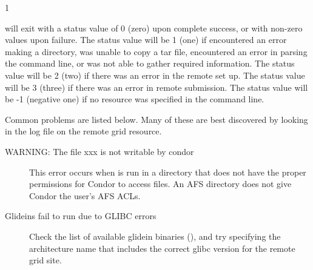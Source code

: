 \begin{ManPage}{\label{man-condor-glidein}}{1}
\begin{Options}
\end{Options}

\ExitStatus

 will exit with a status value of 0 (zero) upon 
complete success,
or with non-zero values upon failure.
The status value will be 1 (one) if 
 encountered an error making a directory,
was unable to copy a tar file,
encountered an error in parsing the command line,
or was not able to gather required information.
The status value will be 2 (two) if 
there was an error in the remote set up.
The status value will be 3 (three) if 
there was an error in remote submission.
The status value will be -1 (negative one) if 
no resource was specified in the command line.

Common problems are listed below.  Many of these are best discovered by
looking in the  log file on the remote grid resource.

\begin{description}

\item[WARNING: The file xxx is not writable by condor]
This error occurs when
 is run in a directory that does not have the proper
permissions for Condor to access files.  An AFS directory
does not give Condor the user's AFS ACLs.

\item[Glideins fail to run due to GLIBC errors] Check the list of
available glidein binaries
(), and try 
specifying the architecture name that includes the correct glibc
version for the remote grid site.


\end{description}
\end{ManPage}
